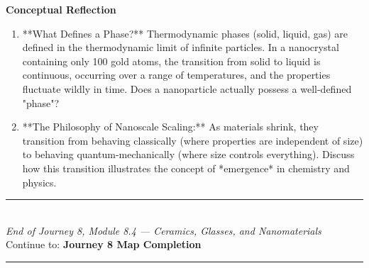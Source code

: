 \documentclass[12pt, a4paper]{book}
\begin{document}
\begin{reflectionbox}
\textbf{Conceptual Reflection}

\begin{enumerate}
  \item **What Defines a Phase?** Thermodynamic phases (solid, liquid, gas) are defined in the thermodynamic limit of infinite particles. In a nanocrystal containing only 100 gold atoms, the transition from solid to liquid is continuous, occurring over a range of temperatures, and the properties fluctuate wildly in time. Does a nanoparticle actually possess a well-defined "phase"?
  \item **The Philosophy of Nanoscale Scaling:** As materials shrink, they transition from behaving classically (where properties are independent of size) to behaving quantum-mechanically (where size controls everything). Discuss how this transition illustrates the concept of *emergence* in chemistry and physics.
\end{enumerate}
\end{reflectionbox}

\vspace{1.4cm}
\begin{center}
{\color{JourneyColor}\rule{0.5\linewidth}{0.8pt}}\\[6pt]
{\small\color{JourneyColor}\textit{End of Journey 8, Module 8.4 --- Ceramics, Glasses, and Nanomaterials}}\\[4pt]
{\small\color{JourneyColor}Continue to: \textbf{Journey 8 Map Completion}}\\[6pt]
{\color{JourneyColor}\rule{0.5\linewidth}{0.8pt}}
\end{center}
\end{document}
